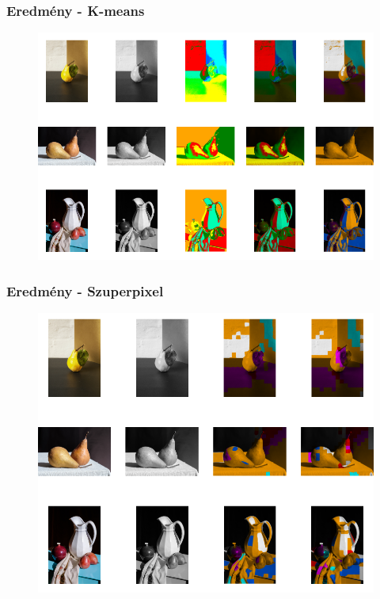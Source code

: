 \documentclass{beamer}
\begin{document}
\begin{frame}[fragile]
\frametitle{Eredmény - K-means}

\begin{figure}[!tbp]
  \centering
  \begin{minipage}[b]{0.9\textwidth}
    \includegraphics[width=\textwidth]{images/result_all_kmeans.png}
  \end{minipage}
\end{figure}

\end{frame}

\begin{frame}[fragile]
\frametitle{Eredmény - Szuperpixel}

\begin{figure}[!tbp]
  \centering
  \begin{minipage}[b]{0.8\textwidth}
    \includegraphics[width=\textwidth]{images/result_all_superpixel.png}
  \end{minipage}
\end{figure}

\end{frame}
\end{document}
